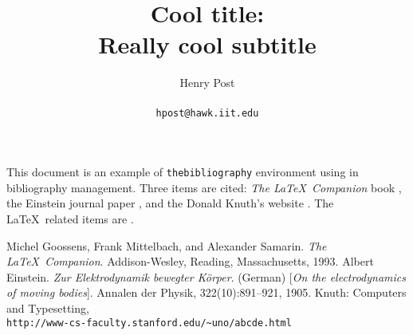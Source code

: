 \documentclass[a4paper,12pt]{article}
\title{Cool title: \\ Really cool subtitle}
\author{Henry Post \\ \\\texttt{hpost@hawk.iit.edu}}
\begin{document}
\maketitle

This document is an example of \texttt{thebibliography} environment using in bibliography management. Three items are cited: \textit{The \LaTeX\ Companion} book \cite{latexcompanion}, the Einstein journal paper \cite{einstein}, and the Donald Knuth's website \cite{knuthwebsite}. The \LaTeX\ related items are \cite{latexcompanion,knuthwebsite}. 

\medskip

\begin{thebibliography}{9}
 Michel Goossens, Frank Mittelbach, and Alexander Samarin. \textit{The \LaTeX\ Companion}. Addison-Wesley, Reading, Massachusetts, 1993.
 Albert Einstein. \textit{Zur Elektrodynamik bewegter K{\"o}rper}. (German) [\textit{On the electrodynamics of moving bodies}]. Annalen der Physik, 322(10):891–921, 1905.
 Knuth: Computers and Typesetting,\\\texttt{http://www-cs-faculty.stanford.edu/\~{}uno/abcde.html}
\end{thebibliography}
\end{document}
